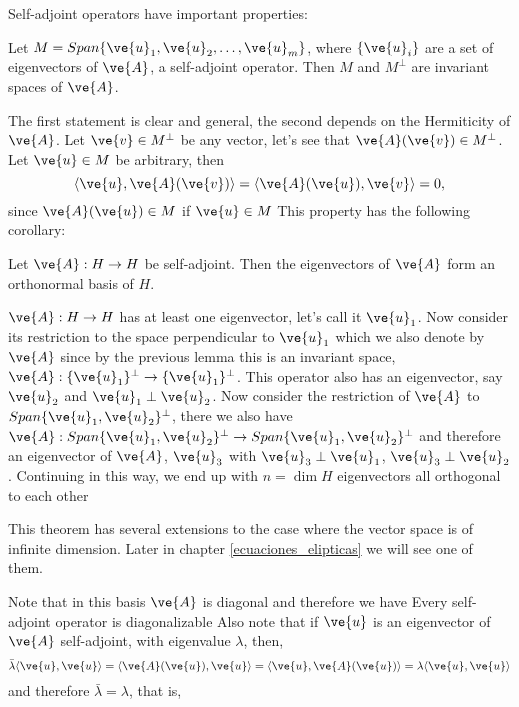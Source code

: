 {Self-adjoint operators have important properties:

\blem
Let $M = Span\{\ve{u}_{1},\ve{u}_2,\dots,\ve{u}_m\}$, where $\{\ve{u}_i\}$
are a set of eigenvectors of $\ve{A}$, a self-adjoint operator.
Then $M$ and $M^{\perp}$ are invariant spaces of $\ve{A}$.
\elem

\bpru 
The first statement is clear and general, the second depends on the
Hermiticity of $\ve{A}$. Let $\ve{v} \in M^{\perp}$ be any vector, let's see
that $\ve{A}(\ve{v}) \in M^{\perp}$. Let $\ve{u} \in M$ be arbitrary, then
\begin{equation}
  \langle \ve{u},\ve{A}(\ve{v}) \rangle = \langle \ve{A}(\ve{u}),\ve{v} \rangle = 0,
\end{equation}
%
since $\ve{A}(\ve{u}) \in M$ if $\ve{u} \in M$
\epru
\espa
This property has the following corollary:

\bcor
Let $\ve{A}:H \to H$ be self-adjoint. Then the eigenvectors of $\ve{A}$ form an orthonormal basis of $H$.
\ecor

\bpru
$\ve{A}: H \to H$ has at least one eigenvector, let's call it $\ve{u}_1$. 
Now consider its restriction to the space perpendicular to $\ve{u}_1$
which we also denote by $\ve{A}$ since by the previous lemma this is
an invariant space, $\ve{A}:\{\ve{u}_1\}^{\perp} \to \{\ve{u}_1\}^{\perp}$.
This operator also has an eigenvector, say $\ve{u}_2$ and 
$\ve{u}_1 \perp \ve{u}_2$. Now consider the restriction of $\ve{A}$ to
$Span\{\ve{u}_1,\ve{u}_2\}^{\perp}$, there we also have 
$\ve{A}:Span\{\ve{u}_1,\ve{u}_2\}^{\perp} \to Span\{\ve{u}_1,\ve{u}_2\}^{\perp}$
and therefore an eigenvector of $\ve{A}$, $\ve{u}_3$ with 
$\ve{u}_3 \perp \ve{u}_1$, $\ve{u}_3 \perp \ve{u}_2$.
Continuing in this way, we end up with $n = \dim H$ eigenvectors all
orthogonal to each other
\epru

This theorem has several extensions to the case where the vector space is
of infinite dimension. 
Later in chapter \ref{ecuaciones_elipticas} we will see one of them.

Note that in this basis $\ve{A}$ is diagonal and therefore we have
\bcor
Every self-adjoint operator is diagonalizable
\ecor
%
Also note that if $\ve{u}$ is an eigenvector of $\ve{A}$ self-adjoint,
with eigenvalue $\lambda$, then,
\begin{equation} 
  \bar{\lambda} \langle \ve{u},\ve{u} \rangle = \langle \ve{A}(\ve{u}),\ve{u} \rangle
                               = \langle \ve{u},\ve{A}(\ve{u})\rangle
                               = \lambda \langle \ve{u},\ve{u} \rangle
\end{equation}
and therefore $\bar{\lambda} = \lambda$, that is,
    
}
